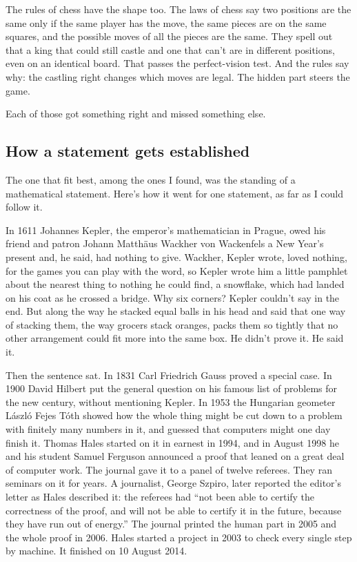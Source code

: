 \documentclass[11pt,twoside]{article}
\theoremstyle{thielethm}
\theoremstyle{thieledef}
\theoremstyle{thieledef}
\theoremstyle{thieledef}
\theoremstyle{thielethm}
\theoremstyle{thieleobs}
\theoremstyle{thielethm}
\begin{document}
The rules of chess have the shape too. The laws of chess say two positions are the same only if the same player has the move, the same pieces are on the same squares, and the possible moves of all the pieces are the same. They spell out that a king that could still castle and one that can't are in different positions, even on an identical board. That passes the perfect-vision test. And the rules say why: the castling right changes which moves are legal. The hidden part steers the game.

Each of those got something right and missed something else.

\subsection{How a statement gets established}

The one that fit best, among the ones I found, was the standing of a mathematical statement. Here's how it went for one statement, as far as I could follow it.

In 1611 Johannes Kepler, the emperor's mathematician in Prague, owed his friend and patron Johann Matthäus Wackher von Wackenfels a New Year's present and, he said, had nothing to give. Wackher, Kepler wrote, loved nothing, for the games you can play with the word, so Kepler wrote him a little pamphlet about the nearest thing to nothing he could find, a snowflake, which had landed on his coat as he crossed a bridge. Why six corners? Kepler couldn't say in the end. But along the way he stacked equal balls in his head and said that one way of stacking them, the way grocers stack oranges, packs them so tightly that no other arrangement could fit more into the same box. He didn't prove it. He said it.

Then the sentence sat. In 1831 Carl Friedrich Gauss proved a special case. In 1900 David Hilbert put the general question on his famous list of problems for the new century, without mentioning Kepler. In 1953 the Hungarian geometer László Fejes Tóth showed how the whole thing might be cut down to a problem with finitely many numbers in it, and guessed that computers might one day finish it. Thomas Hales started on it in earnest in 1994, and in August 1998 he and his student Samuel Ferguson announced a proof that leaned on a great deal of computer work. The journal gave it to a panel of twelve referees. They ran seminars on it for years. A journalist, George Szpiro, later reported the editor's letter as Hales described it: the referees had ``not been able to certify the correctness of the proof, and will not be able to certify it in the future, because they have run out of energy.'' The journal printed the human part in 2005 and the whole proof in 2006. Hales started a project in 2003 to check every single step by machine. It finished on 10 August 2014.
\end{document}
